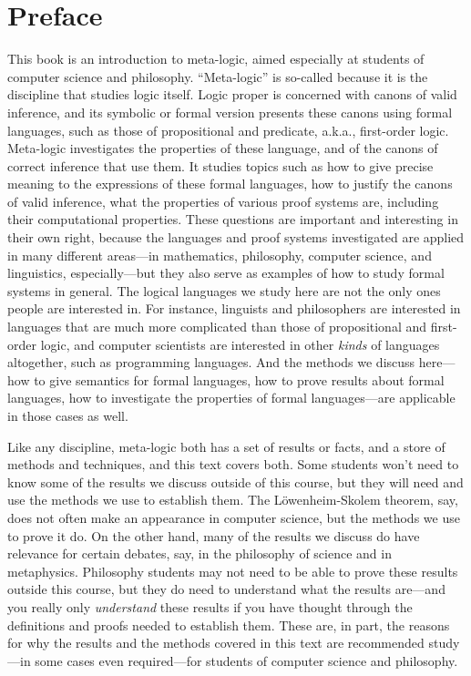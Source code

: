 \chapter{Preface}

This book is an introduction to meta-logic, aimed especially at
students of computer science and philosophy. ``Meta-logic'' is
so-called because it is the discipline that studies logic itself.
Logic proper is concerned with canons of valid inference, and its
symbolic or formal version presents these canons using formal
languages, such as those of propositional and predicate, a.k.a.,
first-order logic. Meta-logic investigates the properties of these
language, and of the canons of correct inference that use them. It
studies topics such as how to give precise meaning to the expressions
of these formal languages, how to justify the canons of valid
inference, what the properties of various proof systems are, including
their computational properties. These questions are important and
interesting in their own right, because the languages and proof
systems investigated are applied in many different areas---in
mathematics, philosophy, computer science, and linguistics,
especially---but they also serve as examples of how to study formal
systems in general. The logical languages we study here are not the
only ones people are interested in. For instance, linguists and
philosophers are interested in languages that are much more
complicated than those of propositional and first-order logic, and
computer scientists are interested in other \emph{kinds} of languages
altogether, such as programming languages. And the methods we discuss
here---how to give semantics for formal languages, how to prove
results about formal languages, how to investigate the properties of
formal languages---are applicable in those cases as well.

Like any discipline, meta-logic both has a set of results or facts,
and a store of methods and techniques, and this text covers both.
Some students won't need to know some of the results we discuss
outside of this course, but they will need and use the methods we use
to establish them. The L\"owenheim-Skolem theorem, say, does not
often make an appearance in computer science, but the methods we use
to prove it do. On the other hand, many of the results we discuss do
have relevance for certain debates, say, in the philosophy of science
and in metaphysics. Philosophy students may not need to be able to
prove these results outside this course, but they do need to
understand what the results are---and you really only
\emph{understand} these results if you have thought through the
definitions and proofs needed to establish them. These are, in part,
the reasons for why the results and the methods covered in this text
are recommended study---in some cases even required---for students of
computer science and philosophy.

